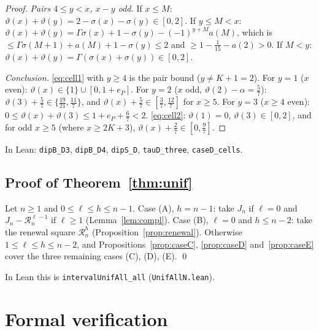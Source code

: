 \documentclass[11pt]{amsart}
\theoremstyle{definition}
\theoremstyle{remark}
\numberwithin{equation}{section}
\newcommand{\cR}{\mathcal{R}}
\newcommand{\lean}[1]{\texttt{#1}}
\begin{document}
\begin{proof}
\emph{Pairs $4\le y<x$, $x-y$ odd.} If $x\le M$: $\vartheta(x)+\vartheta(y)=2-\sigma(x)-\sigma(y)\in[0,2]$. If
$y\le M<x$: $\vartheta(x)+\vartheta(y)=\Gamma\sigma(x)+1-\sigma(y)-(-1)^{y+M}a(M)$, which is
$\le\Gamma\sigma(M+1)+a(M)+1-\sigma(y)\le2$ and $\ge1-\frac1{15}-a(2)>0$. If $M<y$:
$\vartheta(x)+\vartheta(y)=\Gamma(\sigma(x)+\sigma(y))\in[0,2]$.

\emph{Conclusion.} \eqref{eq:cell1} with $y\ge4$ is the pair bound ($y\ne K+1=2$). For $y=1$ ($x$ even):
$\vartheta(x)\in\{1\}\cup[0,1+e_P]$. For $y=2$ ($x$ odd, $\vartheta(2)-\alpha=\frac57$):
$\vartheta(3)+\frac57\in\{\frac{19}{21},\frac{11}7\}$, and $\vartheta(x)+\frac57\in[\frac37,\frac{12}7]$ for
$x\ge5$. For $y=3$ ($x\ge4$ even): $0\le\vartheta(x)+\vartheta(3)\le1+e_P+\frac67<2$. \eqref{eq:cell2}:
$\vartheta(1)=0$, $\vartheta(3)\in[0,2]$, and for odd $x\ge5$ (where $x\ge2K+3$),
$\vartheta(x)+\frac27\in[0,\frac97]$.
\end{proof}

In Lean: \lean{dipB\_D3}, \lean{dipB\_D4}, \lean{dipS\_D}, \lean{tauD\_three}, \lean{caseD\_cells}.

\subsection{Proof of \texorpdfstring{Theorem~\ref{thm:unif}}{Theorem 3}}\label{sec:proofunif}
Let $n\ge1$ and $0\le\ell\le h\le n-1$. Case (A), $h=n-1$: take $J_n$ if $\ell=0$ and
$J_n-\cR^{\ell-1}_n$ if $\ell\ge1$ (Lemma~\ref{lem:compl}). Case (B), $\ell=0$ and $h\le n-2$: take the
renewal square $\cR^h_n$ (Proposition~\ref{prop:renewal}). Otherwise $1\le\ell\le h\le n-2$, and
Propositions~\ref{prop:caseC}, \ref{prop:caseD} and~\ref{prop:caseE} cover the three remaining cases
(C), (D), (E). \qed

In Lean this is \lean{intervalUnifAll\_all} (\lean{UnifAllN.lean}).

\section{Formal verification}\label{sec:lean}
\end{document}
